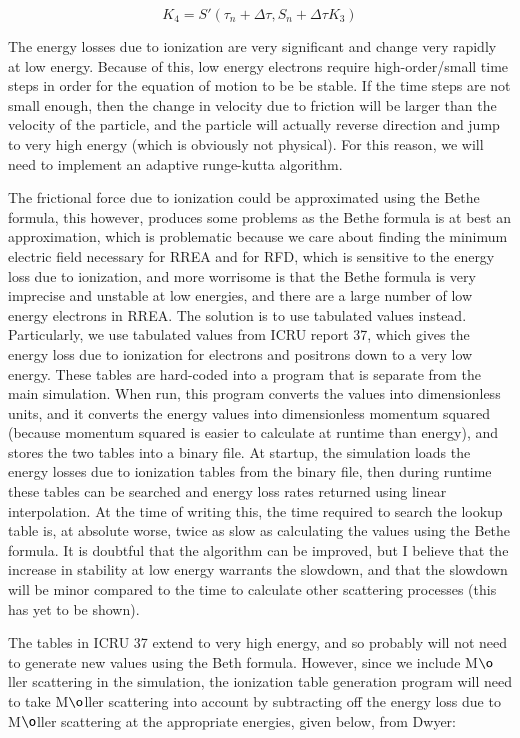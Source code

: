 \documentclass[]{article}
\begin{document}
\begin{equation} 
K_4=S'(\tau_n + \Delta\tau, S_n + \Delta\tau K_3)
\end{equation}

The energy losses due to ionization are very significant and change very rapidly at low energy. Because of this, low energy electrons require high-order/small time steps in order for the equation of motion to be be stable. If the time steps are not small enough, then the change in velocity due to friction will be larger than the velocity of the particle, and the particle will actually reverse direction and jump to very high energy (which is obviously not physical). For this reason, we will need to implement an adaptive runge-kutta algorithm.

The frictional force due to ionization could be approximated using the Bethe formula, this however, produces some problems as the Bethe formula is at best an approximation, which is problematic because we care about finding the minimum electric field necessary for RREA and for RFD, which is sensitive to the energy loss due to ionization, and more worrisome is that the Bethe formula is very imprecise and unstable at low energies, and there are a large number of low energy electrons in RREA. The solution is to use tabulated values instead. Particularly, we use tabulated values from ICRU report 37, which gives the energy loss due to ionization for electrons and positrons down to a very low energy. These tables are hard-coded into a program that is separate from the main simulation. When run, this program converts the values into dimensionless units, and it converts the energy values into dimensionless momentum squared (because momentum squared is easier to calculate at runtime than energy), and stores the two tables into a binary file. At startup, the simulation loads the energy losses due to ionization tables from the binary file, then during runtime these tables can be searched and energy loss rates returned using linear interpolation. At the time of writing this, the time required to search the lookup table is, at absolute worse, twice as slow as calculating the values using the Bethe formula. It is doubtful that the algorithm can be improved, but I believe that the increase in stability at low energy warrants the slowdown, and that the slowdown will be minor compared to the time to calculate other scattering  processes (this has yet to be shown). 

The tables in ICRU 37 extend to very high energy, and so probably will not need to generate new values using the Beth formula. However, since we include M$\o$ller scattering in the simulation, the ionization table generation program will need to take M$\o$ller scattering into account by subtracting off the energy loss due to M$\o$ller scattering at the appropriate energies, given below, from Dwyer:
\end{document}
